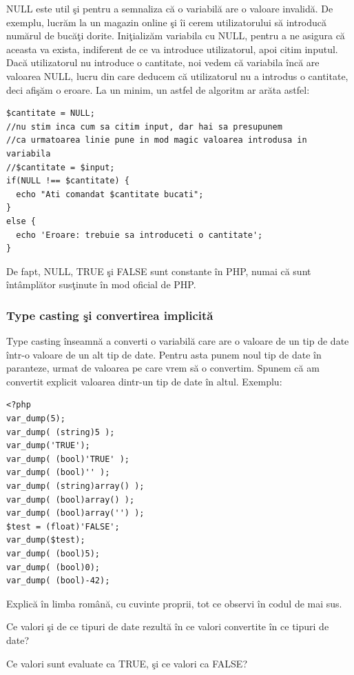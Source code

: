 NULL este util şi pentru a semnaliza că o variabilă are o valoare invalidă.
De exemplu, lucrăm la un magazin online şi îi cerem utilizatorului să
introducă numărul de bucăţi dorite. Iniţializăm variabila cu NULL,
pentru a ne asigura că aceasta va exista, indiferent de ce va introduce
utilizatorul, apoi
citim inputul. Dacă utilizatorul nu introduce o cantitate, noi vedem că
variabila încă are valoarea NULL, lucru din care deducem că utilizatorul
nu a introdus o cantitate, deci afişăm o eroare. La un minim, un astfel
de algoritm ar arăta astfel:
\begin{lstlisting}
$cantitate = NULL;
//nu stim inca cum sa citim input, dar hai sa presupunem
//ca urmatoarea linie pune in mod magic valoarea introdusa in variabila
//$cantitate = $input;
if(NULL !== $cantitate) {
  echo "Ati comandat $cantitate bucati";
}
else {
  echo 'Eroare: trebuie sa introduceti o cantitate';
}
\end{lstlisting}

De fapt, NULL, TRUE şi FALSE sunt constante în PHP, numai că sunt
{\glqq}întâmplător{\grqq} susţinute în mod {\glqq}oficial{\grqq} de PHP.

\subsubsection{Type casting şi convertirea implicită}
Type casting înseamnă a converti o variabilă care are o valoare
de un tip de date într-o valoare de un alt tip de date. Pentru asta
punem noul tip de date în paranteze, urmat de valoarea pe care vrem
să o convertim. Spunem că am convertit explicit valoarea dintr-un tip
de date în altul. Exemplu:
\begin{lstlisting}[label=lst:typecasting,caption=Type casting explicit]
<?php
var_dump(5);
var_dump( (string)5 );
var_dump('TRUE');
var_dump( (bool)'TRUE' );
var_dump( (bool)'' );
var_dump( (string)array() );
var_dump( (bool)array() );
var_dump( (bool)array('') );
$test = (float)'FALSE';
var_dump($test);
var_dump( (bool)5);
var_dump( (bool)0);
var_dump( (bool)-42);
\end{lstlisting}

\begin{Exercise}[title={Observaţii type casting},difficulty=1]
Explică în limba română, cu cuvinte proprii, tot ce observi în codul de mai sus.

Ce valori şi de ce tipuri de date rezultă în ce valori convertite în ce
tipuri de date?

Ce valori sunt evaluate ca TRUE, şi ce valori ca FALSE?
\end{Exercise}

